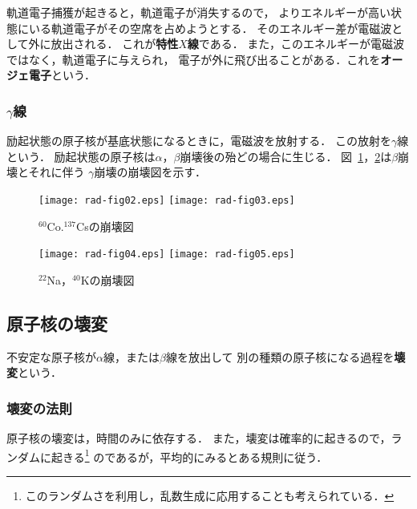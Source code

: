 \documentclass[a4j,10pt,oneside,openany]{jsbook}
\begin{document}
軌道電子捕獲が起きると，軌道電子が消失するので，
よりエネルギーが高い状態にいる軌道電子がその空席を占めようとする．
そのエネルギー差が電磁波として外に放出される．
これが{\bf 特性$X$線}である．
また，このエネルギーが電磁波ではなく，軌道電子に与えられ，
電子が外に飛び出ることがある．これを{\bf オージェ電子}という．

\subsubsection{$\gamma$線}

励起状態の原子核が基底状態になるときに，電磁波を放射する．
この放射を$\gamma$線という．
励起状態の原子核は$\alpha$，$\beta$崩壊後の殆どの場合に生じる．
図~\ref{fig:rad-fig02-3}，\ref{fig:rad-fig04-5}は$\beta$崩壊とそれに伴う
$\gamma$崩壊の崩壊図を示す．

\begin{figure}
  \begin{center}
    \texttt{[image: rad-fig02.eps]}
    \texttt{[image: rad-fig03.eps]}
    \caption{$^{60}$Co.$^{137}$Csの崩壊図}
    \label{fig:rad-fig02-3}
  \end{center}
\end{figure}

\begin{figure}
  \begin{center}
    \texttt{[image: rad-fig04.eps]}
    \texttt{[image: rad-fig05.eps]}
    \caption{$^{22}$Na，$^{40}$Kの崩壊図}
    \label{fig:rad-fig04-5}
  \end{center}
\end{figure}

\subsection{原子核の壊変}\label{sec:decay}

不安定な原子核が$\alpha$線，または$\beta$線を放出して
別の種類の原子核になる過程を{\bf 壊変}という．

\subsubsection{壊変の法則}

原子核の壊変は，時間のみに依存する．
また，壊変は確率的に起きるので，ランダムに起きる\footnote{
このランダムさを利用し，乱数生成に応用することも考えられている．}
のであるが，平均的にみるとある規則に従う．
\end{document}
